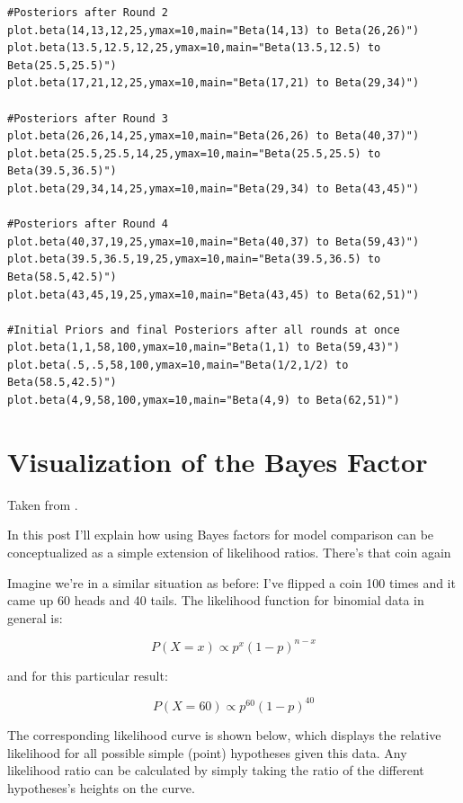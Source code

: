 \begin{lstlisting}
#Posteriors after Round 2
plot.beta(14,13,12,25,ymax=10,main="Beta(14,13) to Beta(26,26)")
plot.beta(13.5,12.5,12,25,ymax=10,main="Beta(13.5,12.5) to Beta(25.5,25.5)")
plot.beta(17,21,12,25,ymax=10,main="Beta(17,21) to Beta(29,34)")

#Posteriors after Round 3
plot.beta(26,26,14,25,ymax=10,main="Beta(26,26) to Beta(40,37)")
plot.beta(25.5,25.5,14,25,ymax=10,main="Beta(25.5,25.5) to Beta(39.5,36.5)")
plot.beta(29,34,14,25,ymax=10,main="Beta(29,34) to Beta(43,45)")

#Posteriors after Round 4
plot.beta(40,37,19,25,ymax=10,main="Beta(40,37) to Beta(59,43)")
plot.beta(39.5,36.5,19,25,ymax=10,main="Beta(39.5,36.5) to Beta(58.5,42.5)")
plot.beta(43,45,19,25,ymax=10,main="Beta(43,45) to Beta(62,51)")

#Initial Priors and final Posteriors after all rounds at once
plot.beta(1,1,58,100,ymax=10,main="Beta(1,1) to Beta(59,43)")
plot.beta(.5,.5,58,100,ymax=10,main="Beta(1/2,1/2) to Beta(58.5,42.5)")
plot.beta(4,9,58,100,ymax=10,main="Beta(4,9) to Beta(62,51)")
\end{lstlisting}

\section{Visualization of the Bayes Factor}
\label{sec:VisualizationoftheBayesFactor}

Taken from  \cite{etz2015b}.

 In this post I'll explain how using Bayes factors for model comparison can be conceptualized as a simple extension of likelihood ratios.
There's that coin again

Imagine we're in a similar situation as before: I've flipped a coin 100 times and it came up 60 heads and 40 tails. The likelihood function for binomial data in general is:

\begin{equation}P(X=x) \propto p^{x}(1-p)^{n-x}\end{equation}

and for this particular result:

\begin{equation}P(X=60) \propto p^{60}(1-p)^{40}\end{equation}

The corresponding likelihood curve is shown below, which displays the relative likelihood for all possible simple (point) hypotheses given this data. Any likelihood ratio can be calculated by simply taking the ratio of the different hypotheses's heights on the curve.


